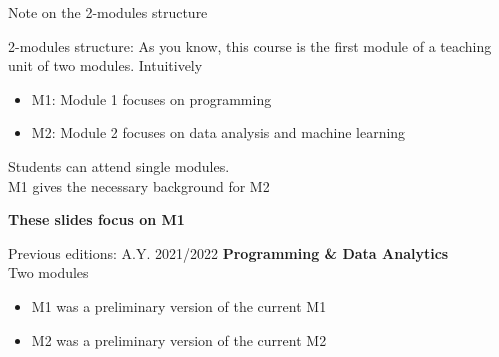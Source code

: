 \documentclass{beamer}%
\begin{document}
\begin{frame}{Note on the 2-modules structure}
	\begin{block}{2-modules structure: \myurl{\homepage}}
		As you know, this course is the first module of a teaching unit of two modules. Intuitively
		\begin{itemize}
			\item M1: Module 1 focuses on programming
			\item M2: Module 2 focuses  on data analysis and machine learning
		\end{itemize}
		Students can attend single modules. \\ M1 gives the necessary background for M2
		\begin{center}\textbf{These slides focus on M1}\end{center}
	\end{block}	
	\begin{block}{Previous editions: A.Y. 2021/2022}
		\textbf{Programming \& Data Analytics}\\ Two modules
		\begin{itemize}
			\item M1 was a preliminary version of the current M1
			\item M2 was a preliminary version of the current M2
		\end{itemize}
	\end{block}
\end{frame}
%
\end{document}
